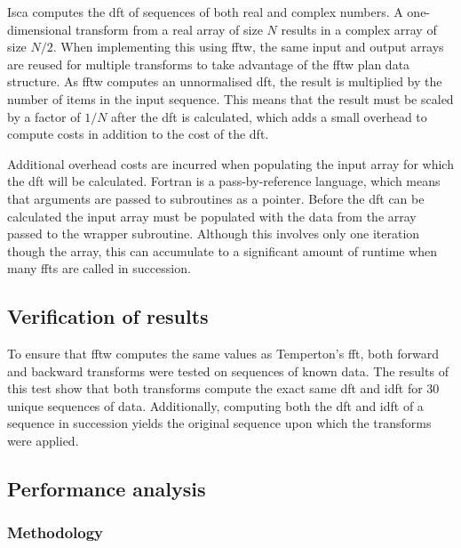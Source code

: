 \documentclass[a4paper,11pt]{report}
\begin{document}
\par
Isca computes the \gls{dft} of sequences of both real and complex numbers. A one-dimensional transform from a real array of size $N$ results in a complex array of size $N/2$. When implementing this using \gls{fftw}, the same input and output arrays are reused for multiple transforms to take advantage of the \gls{fftw} plan data structure. As \gls{fftw} computes an unnormalised \gls{dft}, the result is multiplied by the number of items in the input sequence. This means that the result must be scaled by a factor of $1/N$ after the \gls{dft} is calculated, which adds a small overhead to compute costs in addition to the cost of the \gls{dft}.  
\par
Additional overhead costs are incurred when populating the input array for which the \gls{dft} will be calculated. Fortran is a pass-by-reference language, which means that arguments are passed to subroutines as a pointer. Before the \gls{dft} can be calculated the input array must be populated with the data from the array passed to the wrapper subroutine. Although this involves only one iteration though the array, this can accumulate to a significant amount of runtime when many \gls{fft}s are called in succession.

\subsection{Verification of results}
To ensure that \gls{fftw} computes the same values as Temperton's \gls{fft}, both forward and backward transforms were tested on sequences of known data. The results of this test show that both transforms compute the exact same \gls{dft} and \gls{idft} for 30 unique sequences of data. Additionally, computing both the \gls{dft} and \gls{idft} of a sequence in succession yields the original sequence upon which the transforms were applied.

\subsection{Performance analysis}

\subsubsection{Methodology}
\end{document}
